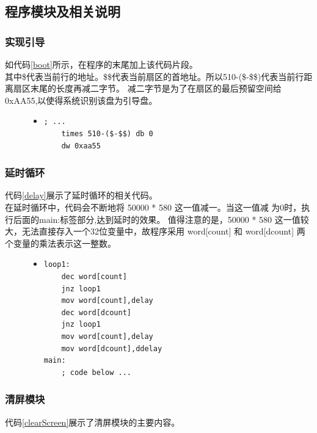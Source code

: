 \documentclass[a4paper]{article}
\newcommand{\codev}[1]{\textsf{#1}}
\begin{document}
\subsection{程序模块及相关说明}\label{modelIntroduction}
\subsubsection{实现引导}
如代码\ref{boot}所示，在程序的末尾加上该代码片段。\\

其中\$代表当前行的地址。\$\$代表当前扇区的首地址。所以510-(\$-\$\$)代表当前行距离扇区末尾的长度再减二字节。
减二字节是为了在扇区的最后预留空间给0xAA55,以使得系统识别该盘为引导盘。
\begin{figure}
\begin{itemize}
\item[] \begin{lstlisting}[language={[x86masm]Assembler}, label=boot, caption=使软盘成为引导盘的关键代码]
    ; ...
    times 510-($-$$) db 0
    dw 0xaa55
\end{lstlisting}
\end{itemize}
\end{figure}
\subsubsection{延时循环}

代码\ref{delay}展示了延时循环的相关代码。\\

在延时循环中，代码会不断地将
50000 * 580 这一值减一。当这一值减
为0时，执行后面的\codev{main:}标签部分,达到延时的效果。
值得注意的是，50000 * 580 这一值较大，无法直接存入一个32位变量中，故程序采用
\codev{word[count]} 和 \codev{word[dcount]} 两个变量的乘法表示这一整数。\\

\begin{figure}
\begin{itemize}
\item[] \begin{lstlisting}[language={[x86masm]Assembler}, label=delay, caption=延时循环]
loop1:
    dec word[count]		
    jnz loop1			
    mov word[count],delay
    dec word[dcount]			
    jnz loop1
    mov word[count],delay
    mov word[dcount],ddelay
main:
    ; code below ...
\end{lstlisting}
\end{itemize}
\end{figure}
\subsubsection{清屏模块}
代码\ref{clearScreen}展示了清屏模块的主要内容。\\ 
\end{document}

